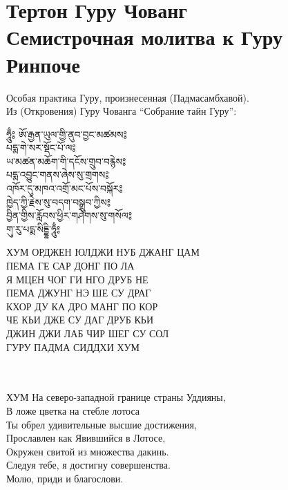\section{Тертон Гуру Чованг \\Семистрочная молитва к Гуру Ринпоче}

\vspace{1cm}

\scriptsize
Особая практика Гуру, произнесенная (Падмасамбхавой).\\
Из (Откровения) Гуру Чованга “Собрание тайн Гуру”:
\vspace{1cm}
\normalsize
\\
\begingroup
\parbox[t][][l]{0.40\textwidth}{
\ti ཧཱུྃ༔ ཨོ་རྒྱན་ཡུལ་གྱི་ནུབ་བྱང་མཚམས༔\\
པདྨ་གེ་སར་སྡོང་པོ་ལ༔\\
ཡ་མཚན་མཆོག་གི་དངོས་གྲུབ་བརྙེས༔\\
པདྨ་འབྱུང་གནས་ཞེས་སུ་གྲགས༔\\
འཁོར་དུ་མཁའ་འགྲོ་མང་པོས་བསྐོར༔\\
ཁྱེད་ཀྱི་རྗེས་སུ་བདག་བསྒྲུབ་ཀྱིས༔\\
བྱིན་གྱིས་རློབས་ཕྱིར་གཤེགས་སུ་གསོལ༔\\
གུ་རུ་པདྨ་སིདྡྷི་ཧཱུྃ༔\\
\ru
}
\hspace{0.2cm}
\parbox[t][][r]{0.60\textwidth}{
\small
\vspace{0.1cm}
ХУМ ОРДЖЕН ЮЛДЖИ НУБ ДЖАНГ ЦАМ\\
ПЕМА ГЕ САР ДОНГ ПО ЛА\\
Я МЦЕН ЧОГ ГИ НГО ДРУБ НЕ\\
ПЕМА ДЖУНГ НЭ ШЕ СУ ДРАГ\\
КХОР ДУ КА ДРО МАНГ ПО КОР\\
ЧЕ КЬИ ДЖЕ СУ ДАГ ДРУБ КЬИ\\
ДЖИН ДЖИ ЛАБ ЧИР ШЕГ СУ СОЛ\\
ГУРУ ПАДМА СИДДХИ ХУМ\\
}
\endgroup
\\
\vspace{1cm}
\\
ХУМ На северо-западной границе страны Уддияны,\\
В ложе цветка на стебле лотоса\\
Ты обрел удивительные высшие достижения,\\
Прославлен как Явившийся в Лотосе,\\
Окружен свитой из множества дакинь.\\
Следуя тебе, я достигну совершенства.\\
Молю, приди и благослови.\\
\\
